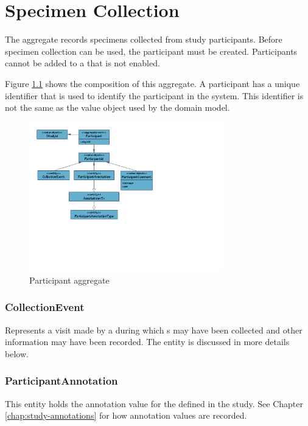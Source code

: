 \chapter{Specimen Collection}

The  aggregate records specimens collected
from study participants. Before specimen collection can be used, the
participant must be created. Participants cannot be added to a
 that is not enabled.

Figure \ref{fig:participant-aggregate} shows the composition of this aggregate.
A participant has a unique identifier that is used to identify the participant
in the system. This identifier is not the same as the
 value object used by the domain model.

\begin{figure}[H]
  \centering
  \includegraphics[trim={10mm 75mm 98mm 10mm}, clip,
    width=0.75\textwidth]{images/participant-aggregate}
  \caption{Participant aggregate}
  \label{fig:participant-aggregate}
\end{figure}

\subsection*{CollectionEvent}
Represents a visit made by a  during which
s may have been collected and other information may have
been recorded. The  entity is discussed in more
details below.

\subsection*{ParticipantAnnotation}
This entity holds the annotation value for the
 defined in the study. See Chapter
\ref{chap:study-annotations} for how annotation values are recorded.

